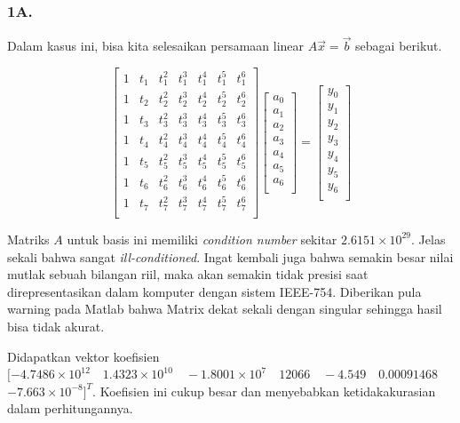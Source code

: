 \documentclass[11pt, a4paper, onecolumn, oneside, final]{report}
\begin{document}
\subsubsection*{1A.}

Dalam kasus ini, bisa kita selesaikan persamaan linear $A\vec{x} = \vec{b}$ sebagai berikut.

$$
\begin{bmatrix}
1 & t_1 & t_1^2 & t_1^3 & t_1^4 & t_1^5 & t_1^6 \\
1 & t_2 & t_2^2 & t_2^3 & t_2^4 & t_2^5 & t_2^6 \\
1 & t_3 & t_3^2 & t_3^3 & t_3^4 & t_3^5 & t_3^6 \\
1 & t_4 & t_4^2 & t_4^3 & t_4^4 & t_4^5 & t_4^6 \\
1 & t_5 & t_5^2 & t_5^3 & t_5^4 & t_5^5 & t_5^6 \\
1 & t_6 & t_6^2 & t_6^3 & t_6^4 & t_6^5 & t_6^6 \\
1 & t_7 & t_7^2 & t_7^3 & t_7^4 & t_7^5 & t_7^6 \\
\end{bmatrix} \begin{bmatrix}
a_0\\
a_1\\
a_2\\
a_3\\
a_4\\
a_5\\
a_6\\
\end{bmatrix} = \begin{bmatrix}
y_0\\
y_1\\
y_2\\
y_3\\
y_4\\
y_5\\
y_6\\
\end{bmatrix}
$$

Matriks $A$ untuk basis ini memiliki \textit{condition number} sekitar $2.6151 \times 10^{29}$. Jelas sekali bahwa sangat \textit{ill-conditioned}. Ingat kembali juga bahwa semakin besar nilai mutlak sebuah bilangan riil, maka akan semakin tidak presisi saat direpresentasikan dalam komputer dengan sistem IEEE-754. Diberikan pula warning pada Matlab bahwa Matrix dekat sekali dengan singular sehingga hasil bisa tidak akurat.

Didapatkan vektor koefisien $[-4.7486 \times 10^{12} \quad 1.4323 \times 10^{10} \quad -1.8001 \times 10^{7} \quad 12066 \quad -4.549 \quad 0.00091468$ $-7.663 \times 10^{-8}]^T$. Koefisien ini cukup besar dan menyebabkan ketidakakurasian dalam perhitungannya.
\end{document}
